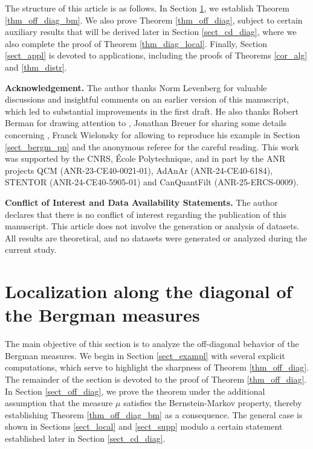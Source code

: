 \documentclass[12pt]{article}
\numberwithin{equation}{section}
\theoremstyle{theorem}
\theoremstyle{definition}
\theoremstyle{remark}
\begin{document}
	\par 
	The structure of this article is as follows.
	In Section \ref{sect_local_main}, we establish Theorem \ref{thm_off_diag_bm}.
	We also prove Theorem \ref{thm_off_diag}, subject to certain auxiliary results that will be derived later in Section \ref{sect_cd_diag}, where we also complete the proof of Theorem \ref{thm_diag_local}.
	Finally, Section \ref{sect_appl} is devoted to applications, including the proofs of Theorems \ref{cor_alg} and \ref{thm_distr}.
	\par
	\textbf{Acknowledgement.}
	The author thanks Norm Levenberg for valuable discussions and insightful comments on an earlier version of this manuscript, which led to substantial improvements in the first draft.
	He also thanks Robert Berman for drawing attention to \cite{BermanOrtega}, Jonathan Breuer for sharing some details concerning \cite{NevaiCond}, Franck Wielonsky for allowing to reproduce his example in Section \ref{sect_bergm_pp} and the anonymous referee for the careful reading. This work was supported by the CNRS, École Polytechnique, and in part by the ANR projects QCM (ANR-23-CE40-0021-01), AdAnAr (ANR-24-CE40-6184), STENTOR (ANR-24-CE40-5905-01) and CanQuantFilt (ANR-25-ERCS-0009).
	\par
	\textbf{Conflict of Interest and Data Availability Statements.}
	The author declares that there is no conflict of interest regarding the publication of this manuscript.
	This article does not involve the generation or analysis of datasets. All results are theoretical, and no datasets were generated or analyzed during the current study.
	
	\section{Localization along the diagonal of the Bergman measures}\label{sect_local_main}
	The main objective of this section is to analyze the off-diagonal behavior of the Bergman measures.
	We begin in Section \ref{sect_exampl} with several explicit computations, which serve to highlight the sharpness of Theorem \ref{thm_off_diag}.
	The remainder of the section is devoted to the proof of Theorem \ref{thm_off_diag}. 
	In Section \ref{sect_off_diag}, we prove the theorem under the additional assumption that the measure $\mu$ satisfies the Bernstein-Markov property, thereby establishing Theorem \ref{thm_off_diag_bm} as a consequence.
	The general case is shown in Sections \ref{sect_local} and \ref{sect_supp} modulo a certain statement established later in Section \ref{sect_cd_diag}.
	
\end{document}
